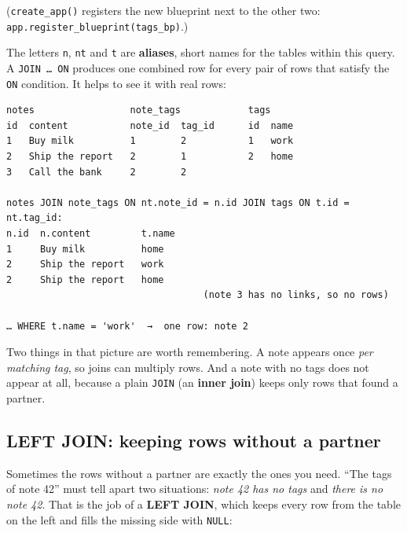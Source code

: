 \noindent{}(\texttt{create\_app()} registers the new blueprint next to the other two: \texttt{app.}\allowbreak{}\texttt{register\_}\allowbreak{}\texttt{blueprint(tags\_}\allowbreak{}\texttt{bp)}.)

The letters \texttt{n}, \texttt{nt} and \texttt{t} are \textbf{aliases}, short names for the tables within this query. A \texttt{JOIN\ …\ ON} produces one combined row for every pair of rows that satisfy the \texttt{ON} condition. It helps to see it with real rows:

\begin{outputbox}[short]
\begin{Verbatim}[fontsize=\codesize, breaklines, breakanywhere, breaksymbolleft={\tiny\textcolor{muted}{$\hookrightarrow$}}]
notes                 note_tags            tags
id  content           note_id  tag_id      id  name
1   Buy milk          1        2           1   work
2   Ship the report   2        1           2   home
3   Call the bank     2        2

notes JOIN note_tags ON nt.note_id = n.id JOIN tags ON t.id = nt.tag_id:
n.id  n.content         t.name
1     Buy milk          home
2     Ship the report   work
2     Ship the report   home
                                   (note 3 has no links, so no rows)

… WHERE t.name = 'work'  →  one row: note 2
\end{Verbatim}
\end{outputbox}

\noindent{}Two things in that picture are worth remembering. A note appears once \emph{per matching tag}, so joins can multiply rows. And a note with no tags does not appear at all, because a plain \texttt{JOIN} (an \textbf{inner join}) keeps only rows that found a partner.

\subsection*{LEFT JOIN: keeping rows without a partner}\label{33-logic-execution:left-join-keeping-rows-without-a-partner}

Sometimes the rows without a partner are exactly the ones you need. ``The tags of note 42'' must tell apart two situations: \emph{note 42 has no tags} and \emph{there is no note 42}. That is the job of a \textbf{LEFT JOIN}, which keeps every row from the table on the left and fills the missing side with \texttt{NULL}:

